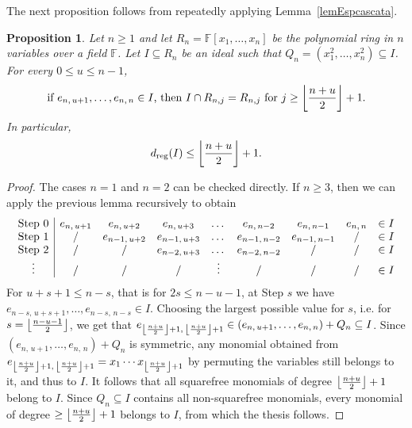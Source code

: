 \documentclass[11pt]{article}
\newcommand{\F}[0]{\mathbb{F}}
\newcommand{\N}[0]{\mathbb{N}}
\newcommand{\es}[2]{e_{#1,\, #2}}
\DeclarePairedDelimiter{\fl}{\lfloor}{\rfloor}
\theoremstyle{plain}
\newtheorem{prop}[theo]{Proposition}
\theoremstyle{definition}
\theoremstyle{remark}
\begin{document}
The next proposition follows from repeatedly applying Lemma~\ref{lemEspcascata}.
\begin{prop}\label{propAlgoESP}
    Let $n\geq 1$ and let $R_n=\F[x_1,\dots,x_n]$ be the polynomial ring in $n$ variables over a field $\F$. Let $I\subseteq R_n$ be an ideal such that $Q_n=(x_1^2,\dots,x_n^2)\subseteq I$. For every $0\leq u\leq n-1$,
    \begin{equation*}
        \text{if }\es{n}{u+1},\dots,\es{n}{n}\in I\text{, then }I\cap R_{n,j}=R_{n,j}\text{ for }j\geq\fl*{\frac{n+u}{2}}+1.
    \end{equation*}
In particular, $$d_{\operatorname{reg}}(I)\leq\fl*{\frac{n+u}{2}}+1.$$
\end{prop}
\begin{proof}
    The cases $n=1$ and $n=2$ can be checked directly.
    If $n\geq 3$, then we can apply the previous lemma recursively to obtain
    \begin{equation*}
        \begin{array}{c | c c c c c c c c}
             \text{Step 0} & \es{n}{u+1} & \es{n}{u+2} & \es{n}{u+3} & \dots & \es{n}{n-2} & \es{n}{n-1} & \es{n}{n} & \in I\\
             \text{Step 1} & / & \es{n-1}{u+2} & \es{n-1}{u+3} & \dots & \es{n-1}{n-2} & \es{n-1}{n-1} & / & \in I\\
             \text{Step 2} & / & / & \es{n-2}{u+3} & \dots & \es{n-2}{n-2} & / & / & \in I\\
             \vdots &  / & / & / & \vdots & / & / & / & \in I\\
        \end{array}
    \end{equation*}
    For $u+s+1\leq n-s$, that is for $2s\leq n-u-1$, at Step $s$ we have $\es{n-s}{u+s+1},\dots,\es{n-s}{n-s}\in I$. Choosing the largest possible value for $s$, i.e. for $s=\fl*{\frac{n-u-1}{2}}$,
    we get that $\es{\fl*{\frac{n+u}{2}}+1}{\fl*{\frac{n+u}{2}}+1}\in (\es{n}{u+1},\dots,\es{n}{n})+Q_n\subseteq I$. Since $(\es{n}{u+1},\dots,\es{n}{n})+Q_n$ is symmetric, any monomial obtained from $\es{\fl*{\frac{n+u}{2}}+1}{\fl*{\frac{n+u}{2}}+1}=x_1\cdots x_{\fl*{\frac{n+u}{2}}+1}$ by permuting the variables still belongs to it, and thus to $I$. It follows that all squarefree monomials of degree $\fl*{\frac{n+u}{2}}+1$ belong to $I$. Since $Q_n\subseteq I$ contains all non-squarefree monomials, every monomial of degree $\geq\fl*{\frac{n+u}{2}}+1$ belongs to $I$, from which the thesis follows.
    

\end{proof}
\end{document}
